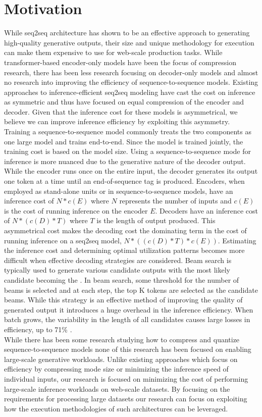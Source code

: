 \section{Motivation}
While seq2seq architecture has shown to be an effective approach to generating high-quality generative outputs, their size and unique methodology for execution can make them expensive to use for web-scale production tasks. While transformer-based encoder-only models have been the focus of compression research, there has been less research focusing on decoder-only models and almost no research into improving the efficiency of sequence-to-sequence models. Existing approaches to inference-efficient seq2seq modeling have cast the cost on inference as symmetric and thus have focused on equal compression of the encoder and decoder. Given that the inference cost for these models is asymmetrical, we believe we can improve inference efficiency by exploiting this asymmetry. \\
Training a sequence-to-sequence model commonly treats the two components as one large model and trains end-to-end. Since the model is trained jointly, the training cost is based on the model size. Using a sequence-to-sequence mode for inference is more nuanced due to the generative nature of the decoder output. While the encoder runs once on the entire input, the decoder generates its output one token at a time until an end-of-sequence tag is produced. Encoders, when employed as stand-alone units or in sequence-to-sequence models, have an inference cost of  $N*c(E)$ where $N$ represents the number of inputs and $c(E)$ is the cost of running inference on the encoder $E$. Decoders have an inference cost of  $N*(c(D)*T)$  where $T$ is the length of output produced. This asymmetrical cost makes the decoding cost the dominating term in the cost of running inference on a seq2seq model, $N*((c(D)*T)* c(E))$. Estimating the inference cost and determining optimal utilization patterns becomes more difficult when effective decoding strategies are considered. Beam search is typically used to generate various candidate outputs with the most likely candidate becoming the . In beam search, some threshold for the number of beams is selected and at each step, the top K tokens are selected as the candidate beams. While this strategy is an effective method of improving the quality of generated output it introduces a huge overhead in the inference efficiency. When batch grows, the variability in the length of all candidates causes large losses in efficiency, up to 71\% \cite{Yang2020ASA}. \\
While there has been some research studying how to compress and quantize sequence-to-sequence models \cite{Li2022DQBARTES} none of this research has been focused on enabling large-scale generative workloads. Unlike existing approaches which focus on efficiency by compressing mode size or minimizing the inference speed of individual inputs, our research is focused on minimizing the cost of performing large-scale inference workloads on web-scale datasets. By focusing on the requirements for processing large datasets our research can focus on exploiting how the execution methodologies of such architectures can be leveraged.  
